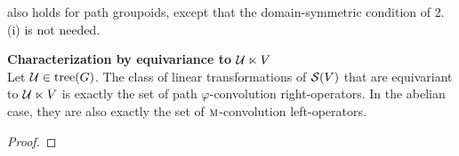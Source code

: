  also holds for path groupoids, except that the domain-symmetric condition of 2.(i) is not needed.

\begin{corrolary}\textbf{Characterization by equivariance to $\mathcal{U} \ltimes V$}\\
Let $\mathcal{U} \in \operatorname{tree}(G)$. The class of linear transformations of $\mathcal{S}(V)$ that are equivariant to $\mathcal{U} \ltimes V$ is exactly the set of path $\varphi$-convolution right-operators. In the abelian case, they are also exactly the set of $\operatorname{\textsc{m}}$-convolution left-operators.
\end{corrolary}

\begin{proof}
\end{proof}


